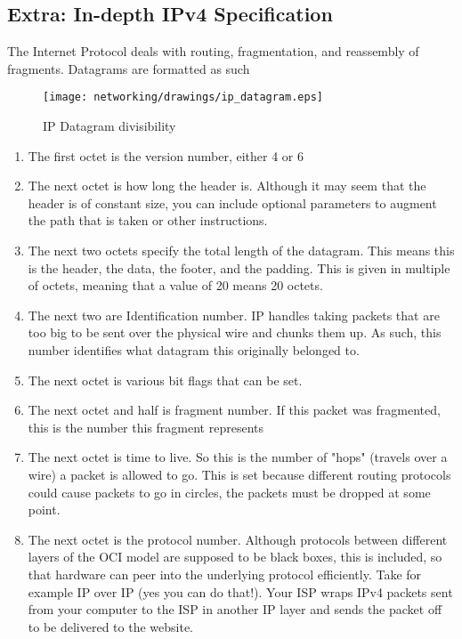 \subsection{Extra: In-depth IPv4 Specification}

The Internet Protocol deals with routing, fragmentation, and reassembly of fragments.
Datagrams are formatted as such

\begin{figure}[H]
  \centering
\texttt{[image: networking/drawings/ip\_datagram.eps]}
\caption{IP Datagram divisibility}
\end{figure}

\begin{enumerate}
  \item The first octet is the version number, either 4 or 6
  \item The next octet is how long the header is.
    Although it may seem that the header is of constant size, you can include optional parameters to augment the path that is taken or other instructions.
  \item The next two octets specify the total length of the datagram.
    This means this is the header, the data, the footer, and the padding.
    This is given in multiple of octets, meaning that a value of 20 means 20 octets.
  \item The next two are Identification number.
    IP handles taking packets that are too big to be sent over the physical wire and chunks them up.
    As such, this number identifies what datagram this originally belonged to.
  \item The next octet is various bit flags that can be set.
  \item The next octet and half is fragment number.
    If this packet was fragmented, this is the number this fragment represents
  \item The next octet is time to live.
    So this is the number of "hops" (travels over a wire) a packet is allowed to go.
    This is set because different routing protocols could cause packets to go in circles, the packets must be dropped at some point.
  \item The next octet is the protocol number.
    Although protocols between different layers of the OCI model are supposed to be black boxes, this is included, so that hardware can peer into the underlying protocol efficiently.
    Take for example IP over IP (yes you can do that!).
    Your ISP wraps IPv4 packets sent from your computer to the ISP in another IP layer and sends the packet off to be delivered to the website.

\end{enumerate}
